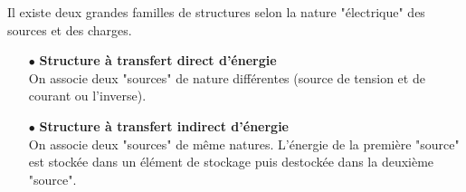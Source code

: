 \documentclass[main.tex]{subfiles}
\begin{document}
Il existe deux grandes familles de structures selon la nature "électrique"  des sources et des charges.
\begin{itemize}
	

\item[$\bullet$] \textbf{Structure à transfert direct d'énergie}\\

	On associe deux "sources" de nature différentes (source de tension et de courant ou l'inverse).
	
	
\item[$\bullet$]  \textbf{Structure à transfert indirect d'énergie}\\

	On associe deux "sources" de même natures. L'énergie de la première "source" est stockée dans un élément de stockage puis destockée dans la deuxième "source".
	
	
\end{itemize}
\end{document}
